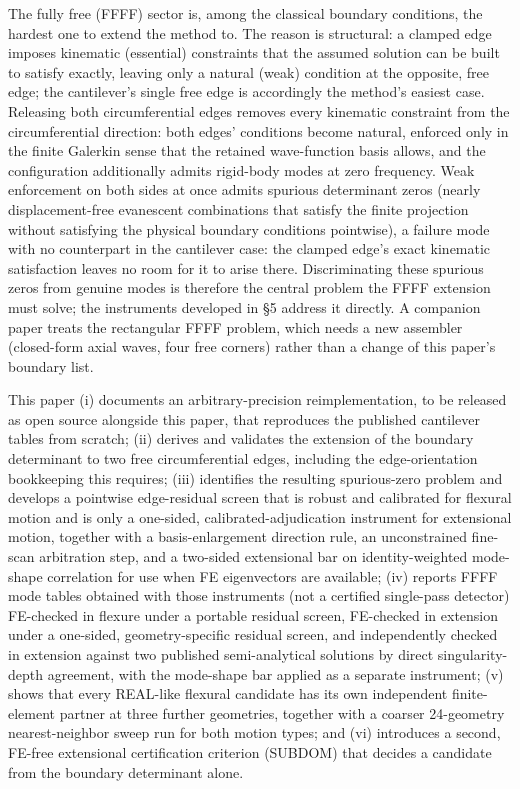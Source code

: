 \documentclass[11pt]{article}
\begin{document}
The fully free (FFFF) sector is, among the classical boundary conditions,
the hardest one to extend the method to. The reason is structural: a
clamped edge imposes kinematic
(essential) constraints that the assumed solution can be built to satisfy
exactly, leaving only a natural (weak) condition at the opposite, free
edge; the cantilever's single free edge is accordingly the method's easiest
case. Releasing both circumferential edges removes every kinematic
constraint from the circumferential direction: both edges' conditions
become natural, enforced only in the finite Galerkin sense that the
retained wave-function basis allows, and the configuration additionally
admits rigid-body modes at zero frequency. Weak enforcement on both sides
at once admits spurious determinant zeros (nearly
displacement-free evanescent combinations that satisfy the finite
projection without satisfying the physical boundary conditions pointwise),
a failure mode with no counterpart in the cantilever case: the
clamped edge's exact kinematic satisfaction leaves no room for it to arise there.
Discriminating these spurious zeros from genuine modes is therefore the
central problem the FFFF extension must solve; the
instruments developed in \S5 address it directly.
A companion paper \cite{mccune2026rect} treats the rectangular FFFF
problem, which needs a new assembler (closed-form axial waves, four free
corners) rather than a change of this paper's boundary list.

This paper (i) documents an arbitrary-precision reimplementation, to be
released as open source alongside this paper, that reproduces the
published cantilever tables from scratch; (ii) derives and validates the extension of the boundary
determinant to two free circumferential edges, including the
edge-orientation bookkeeping this requires; (iii) identifies the resulting
spurious-zero problem and develops a pointwise edge-residual screen that
is robust and calibrated for flexural motion and is only a one-sided,
calibrated-adjudication instrument for extensional motion, together with a
basis-enlargement direction rule, an unconstrained fine-scan
arbitration step, and a two-sided extensional bar on identity-weighted
mode-shape correlation for use when FE eigenvectors are available;
(iv) reports FFFF mode tables obtained with those
instruments (not a certified single-pass detector) FE-checked in
flexure under a portable residual screen, FE-checked in extension under
a one-sided, geometry-specific residual screen, and independently
checked in extension against two published semi-analytical solutions by
direct singularity-depth agreement, with the mode-shape bar applied as a
separate instrument; (v) shows that every REAL-like flexural candidate
has its own independent finite-element partner at three further
geometries, together with a coarser 24-geometry nearest-neighbor sweep run for both motion types;
and (vi) introduces a second, FE-free extensional certification
criterion (SUBDOM) that decides a candidate from the boundary
determinant alone.
\end{document}
